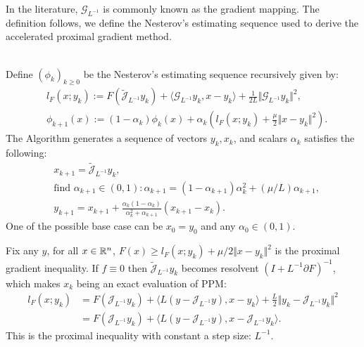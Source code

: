 \documentclass[12pt]{article}
\begin{document}
    In the literature, $\mathcal G_{L^{-1}}$ is commonly known as the gradient mapping. 
    The definition follows, we define the Nesterov's estimating sequence used to derive the accelerated proximal gradient method. 
    \begin{definition}
    \label{def:nes-est-seq-pg}\;\\
        Define $(\phi_k)_{k \ge0}$ be the Nesterov's estimating sequence recursively given by: 
        \begin{align*}
            & l_F(x; y_k) := 
                F\left(\widetilde{\mathcal J}_{L^{-1}} y_k \right) 
                + \langle \mathcal G_{L^{-1}}y_k, x - y_k\rangle + 
            \frac{1}{2L}\Vert \mathcal G_{L^{-1}}y_k\Vert^2, 
            \\
            & 
            \phi_{k + 1}(x)
            := (1 - \alpha_k)\phi_k (x) + 
            \alpha_k 
            \left(
                l_F(x; y_k) + \frac{\mu}{2}\Vert x - y_k\Vert^2
            \right). 
        \end{align*}
        The Algorithm generates a sequence of vectors $y_k, x_k$, and scalars $\alpha_k$ satisfies the following: 
        \begin{align*}
            &x_{k + 1} = \widetilde{\mathcal J}_{L^{-1}} y_k, 
            \\
            & \text{find } \alpha_{k + 1} \in (0, 1): 
            \alpha_{k + 1} = (1 - \alpha_{k + 1})\alpha_k^{2} + (\mu/L) \alpha_{k + 1}, 
            \\
            &y_{k + 1} = x_{k + 1} + \frac{\alpha_k(1 - \alpha_k)}{\alpha_k^2 + \alpha_{k + 1}}(x_{k + 1} - x_k). 
        \end{align*}
        One of the possible base case can be $x_0 = y_0$ and any $\alpha_0 \in (0, 1)$. 
    \end{definition}
    \begin{observation}
        Fix any $y$, for all $x\in \mathbb R^n$, $F(x) \ge l_F(x; y_k) + \mu/2\Vert x - y_k\Vert^2$ is the proximal gradient inequality. 
        If $f \equiv 0$ then $\widetilde{\mathcal J}_{L^{-1}}y_k$ becomes resolvent $(I + L^{-1}\partial F)^{-1}$, which makes $x_k$ being an exact evaluation of PPM: 
        \begin{align*}
            l_F(x; y_k) 
            &= F(\mathcal J_{L^{-1}}y_k) 
            + \langle L(y - \mathcal J_{L^{-1}} y), x - y_k\rangle + \frac{L}{2}\Vert y_k - \mathcal J_{L^{-1}}y_k\Vert^2
            \\
            &= F(\mathcal J_{L^{-1}}y_k) 
            + \langle L(y - \mathcal J_{L^{-1}} y), x - \mathcal J_{L^{-1}}y_k\rangle. 
        \end{align*}
        This is the proximal inequality with constant a step size: $L^{-1}$. 
    \end{observation}
\end{document}

